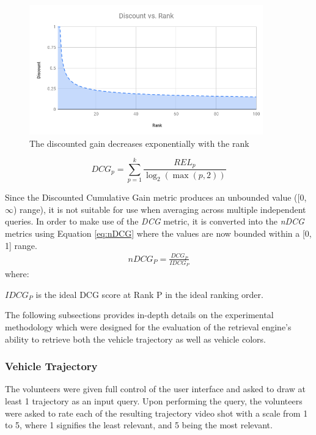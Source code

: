 \begin{figure}[h]
\centering
\includegraphics[width=0.9\textwidth]{image/retrievalTwo/discountvsrank.png}
\caption{The discounted gain decreases exponentially with the rank}
\label{fig:dcgGain}       %
\end{figure}

\begin{equation}
\label{eq:DCGk}
DCG_p = \sum_{p=1}^k\frac{REL_{p}}{\log_2 (\max (p,2))}
\end{equation}


Since the Discounted Cumulative Gain metric produces an unbounded value ([0, $\infty$) range), it is not suitable for use when averaging across multiple independent queries. In order to make use of the \textit{DCG} metric, it is converted into the \textit{nDCG} metrics using Equation \ref{eq:nDCG} where the values are now bounded within a [0, 1] range.
\begin{align}
\label{eq:nDCG}
\textit{nDCG}_P = \frac{DCG_P}{IDCG_P} 
\end{align}
where: 

\hspace{2em} $IDCG_P$ is the ideal DCG score at Rank P in the ideal ranking order.

The following subsections provides in-depth details on the experimental methodology which were designed for the evaluation of the retrieval engine's ability to retrieve both the vehicle trajectory as well as vehicle colors. 


\subsubsection{Vehicle Trajectory}
 The volunteers were given full control of the user interface and asked to draw at least 1 trajectory as an input query. Upon performing the query, the volunteers were asked to rate each of the resulting trajectory video shot with a scale from 1 to 5, where 1 signifies the least relevant, and 5 being the most relevant. 
 
